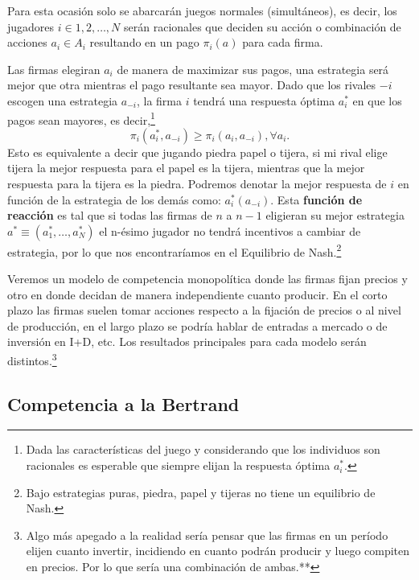 Para esta ocasión solo se abarcarán juegos normales (simultáneos), es decir, los jugadores $i \in 1,2,\ldots,N$ serán racionales que deciden su acción o combinación de acciones $a_i \in A_i$ resultando en un pago $\pi_i(a)$ para cada firma.

Las firmas elegiran $a_i$ de manera de maximizar sus pagos, una estrategia será mejor que otra mientras el pago resultante sea mayor. Dado que los rivales $-i$ escogen una estrategia $a_{-i}$, la firma $i$ tendrá una respuesta óptima $a_i^*$ en que los pagos sean mayores, es decir,\footnote{Dada las características del juego y considerando que los individuos son racionales es esperable que siempre elijan la respuesta óptima $a_i^*$.} 
\begin{equation}
    \pi_i(a_i^*, a_{-i}) \geq \pi_i(a_i, a_{-i}), \forall a_i . \label{eq: mejor respuesta}
\end{equation}
Esto es equivalente a decir que jugando piedra papel o tijera, si mi rival elige tijera la mejor respuesta para el papel es la tijera, mientras que la mejor respuesta para la tijera es la piedra. Podremos denotar la mejor respuesta de $i$ en función de la estrategia de los demás como: $a^*_i(a_{-i})$. Esta \textbf{función de reacción} es tal que si todas las firmas de $n$ a $n-1$ eligieran su mejor estrategia $a^* \equiv (a_1^*,\ldots,a_N^*)$ el n-ésimo jugador no tendrá incentivos a cambiar de estrategia, por lo que nos encontraríamos en el Equilibrio de Nash.\footnote{Bajo estrategias puras, piedra, papel y tijeras no tiene un equilibrio de Nash.} 

Veremos un modelo de competencia monopolítica donde las firmas fijan precios y otro en donde decidan de manera independiente cuanto producir. En el corto plazo las firmas suelen tomar acciones respecto a la fijación de precios o al nivel de producción, en el largo plazo se podría hablar de entradas a mercado o de inversión en I+D, etc. Los resultados principales para cada modelo serán distintos.\footnote{Algo más apegado a la realidad sería pensar que las firmas en un período elijen cuanto invertir, incidiendo en cuanto podrán producir y luego compiten en precios. Por lo que sería una combinación de ambas.**}

\subsection{Competencia a la Bertrand}

